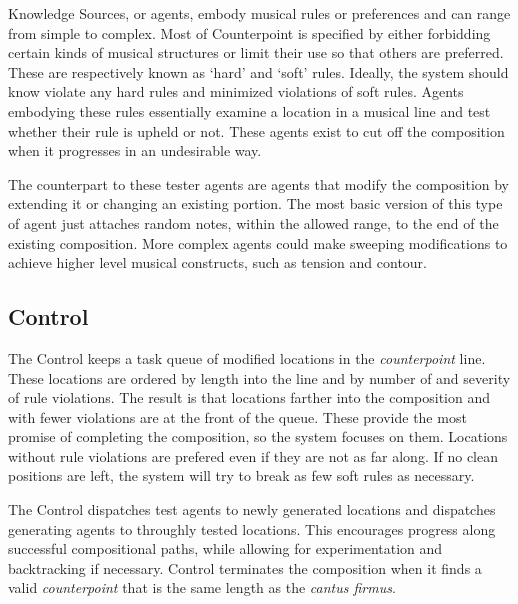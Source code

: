 Knowledge Sources, or agents, embody musical rules or preferences and can range from simple to complex.
Most of Counterpoint is specified by either forbidding certain kinds of musical structures or limit their use so that others are preferred.
These are respectively known as `hard' and `soft' rules. Ideally, the system should know violate any hard rules and minimized violations of soft rules.
Agents embodying these rules essentially examine a location in a musical line and test whether their rule is upheld or not.
These agents exist to cut off the composition when it progresses in an undesirable way.

The counterpart to these tester agents are agents that modify the composition by extending it or changing an existing portion.
The most basic version of this type of agent just attaches random notes, within the allowed range, to the end of the existing composition.
More complex agents could make sweeping modifications to achieve higher level musical constructs, such as tension and contour.

\subsection{Control} %

The Control keeps a task queue of modified locations in the \emph{counterpoint} line.
These locations are ordered by length into the line and by number of and severity of rule violations.
The result is that locations farther into the composition and with fewer violations are at the front of the queue.
These provide the most promise of completing the composition, so the system focuses on them.
Locations without rule violations are prefered even if they are not as far along.
If no clean positions are left, the system will try to break as few soft rules as necessary.

The Control dispatches test agents to newly generated locations and dispatches generating agents to throughly tested locations.
This encourages progress along successful compositional paths, while allowing for experimentation and backtracking if necessary.
Control terminates the composition when it finds a valid \emph{counterpoint} that is the same length as the \emph{cantus firmus}.
